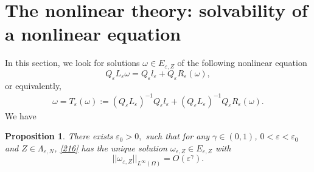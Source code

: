 \documentclass[12pt,reqno]{amsart}
\numberwithin{equation}{section}
\newtheorem{proposition}[theorem]{Proposition}
\theoremstyle{definition}
\theoremstyle{remark}
\begin{document}
\section{The nonlinear theory: solvability of a nonlinear equation}



In this section, we look for  solutions $ \omega\in E_{\varepsilon,Z}  $ of the following nonlinear equation
\begin{equation}\label{216}
Q_\varepsilon L_\varepsilon \omega=Q_\varepsilon l_\varepsilon+Q_\varepsilon R_\varepsilon(\omega),
\end{equation}
or equivalently,
\begin{equation*}
\begin{split}
\omega=T_\varepsilon(\omega):=(Q_\varepsilon L_\varepsilon)^{-1}Q_\varepsilon l_\varepsilon+(Q_\varepsilon L_\varepsilon)^{-1}Q_\varepsilon R_\varepsilon(\omega).
\end{split}
\end{equation*}
We have
\begin{proposition}\label{exist and uniq of w}
There exists $ \varepsilon_0>0, $ such that for any $ \gamma\in (0,1) $, $ 0<\varepsilon<\varepsilon_0 $ and $ Z\in \Lambda_{\varepsilon,N} $, \eqref{216} has the unique solution $ \omega_{\varepsilon,Z}\in E_{\varepsilon,Z} $ with
\begin{equation*}
||\omega_{\varepsilon,Z}||_{L^\infty(\Omega)}=O\left( \varepsilon^\gamma \right).
\end{equation*}
\end{proposition}
\end{document}
